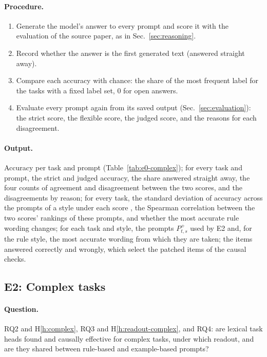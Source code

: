 \documentclass[11pt,a4paper]{article}
\begin{document}
\paragraph{Procedure.}
\begin{enumerate}
\item Generate the model's answer to every prompt and score it with the evaluation of the source paper, as in Sec.~\ref{sec:reasoning}.
\item Record whether the answer is the first generated text (answered straight away).
\item Compare each accuracy with chance: the share of the most frequent label for the tasks with a fixed label set, 0 for open answers.
\item Evaluate every prompt again from its saved output (Sec.~\ref{sec:evaluation}): the strict score, the flexible score, the judged score, and the reasons for each disagreement.
\end{enumerate}

\paragraph{Output.} Accuracy per task and prompt (Table~\ref{tab:e0-complex}); for every task and prompt, the strict and judged accuracy, the share answered straight away, the four counts of agreement and disagreement between the two scores, and the disagreements by reason; for every task, the standard deviation of accuracy across the prompts of a style under each score \citep{hua2025flaw}, the Spearman correlation between the two scores' rankings of these prompts, and whether the most accurate rule wording changes; for each task and style, the prompts $P^{+}_{t,s}$ used by E2 and, for the rule style, the most accurate wording from which they are taken; the items answered correctly and wrongly, which select the patched items of the causal checks.

\subsection{E2: Complex tasks}\label{sec:e2}
\paragraph{Question.} RQ2 and H\ref{h:complex}, RQ3 and H\ref{h:readout-complex}, and RQ4: are lexical task heads found and causally effective for complex tasks, under which readout, and are they shared between rule-based and example-based prompts?
\end{document}
